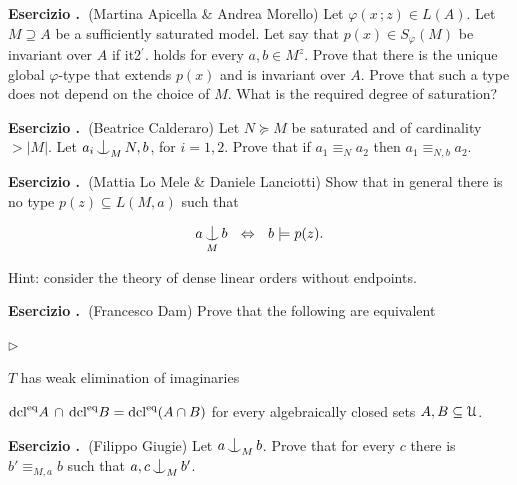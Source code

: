 \documentclass[10pt]{article}
\def\phi{\varphi}
\def\U{\EuScript U}
\def\IFF{\Leftrightarrow}
\def\dcl{\textrm{dcl}}
\def\eq{{\rm eq}}
\def\nonfork{\mathop{\raise0.2ex\hbox{\ooalign{\hidewidth$\vert$\hidewidth\cr\raise-0.9ex\hbox{$\smile$}}}}}
\newcommand{\labella}[1]{{\sf\footnotesize #1}\hfill}
\renewenvironment{itemize}
  {\begin{list}{$\triangleright$}{%
   \setlength{\parskip}{0mm}
   \setlength{\topsep}{0mm}
   \setlength{\rightmargin}{0mm}
   \setlength{\listparindent}{0mm}
   \setlength{\itemindent}{0mm}
   \setlength{\labelwidth}{3ex}
   \setlength{\itemsep}{0mm}
   \setlength{\parsep}{0mm}
   \setlength{\partopsep}{0mm}
   \setlength{\labelsep}{1ex}
   \setlength{\leftmargin}{\labelwidth+\labelsep}
   \let\makelabel\labella}}{%
   \vspace*{-.3\baselineskip}
  \end{list}}
\newcounter{ex}
\newenvironment{exercise}{\bigskip\addtocounter{ex}{1}\textbf{Esercizio \theex.\ }}{}
\def\ssf#1{\textsf{#1}}
\begin{document}
\begin{exercise}(Martina Apicella \& Andrea Morello)
  Let $\phi(x\,;z)\in L(A)$. 
  Let $M\supseteq A$ be a sufficiently saturated model.
  Let say that $p(x)\in S_\phi(M)$ be invariant over $A$ if \ssf{it2$^\prime$.} holds for every $a,b\in M^z$.
  Prove that there is the unique global $\phi$-type that extends $p(x)$ and is invariant over $A$.
  Prove that such a type does not depend on the choice of $M$.
  What is the required degree of saturation?
\end{exercise}


\begin{exercise}(Beatrice Calderaro)
  Let $N\succeq M$ be saturated and of cardinality $>|M|$.
  Let $a_i\nonfork_M N, b$, for $i=1,2$. 
  Prove that if $a_1\equiv_N a_2$ then $a_1\equiv_{N,b} a_2$.
\end{exercise}


\begin{exercise}(Mattia Lo Mele \& Daniele Lanciotti)
  Show that in general there is no type $p(z)\subseteq L(M,a)$ such that 

   $$a\nonfork_M b\ \ \IFF\ \  b\models p(z).$$

  Hint: consider the theory of dense linear orders without endpoints.
\end{exercise}

\begin{exercise}(Francesco Dam)
  Prove that the following are equivalent
  \begin{itemize}
  \item[1.] $T$ has weak elimination of imaginaries
  \item[2.] $\dcl^\eq A\,\cap\,\dcl^\eq B=\dcl^\eq(A\cap B)$ for every algebraically closed sets $A,B\subseteq\U$.
\end{itemize}
\end{exercise}

\begin{exercise}(Filippo Giugie)
  Let $a\nonfork_M b$. 
  Prove that for every $c$ there is $b'\equiv_{M,a} b$ such that $a,c\nonfork_M b'$. 
\end{exercise}
\end{document}
